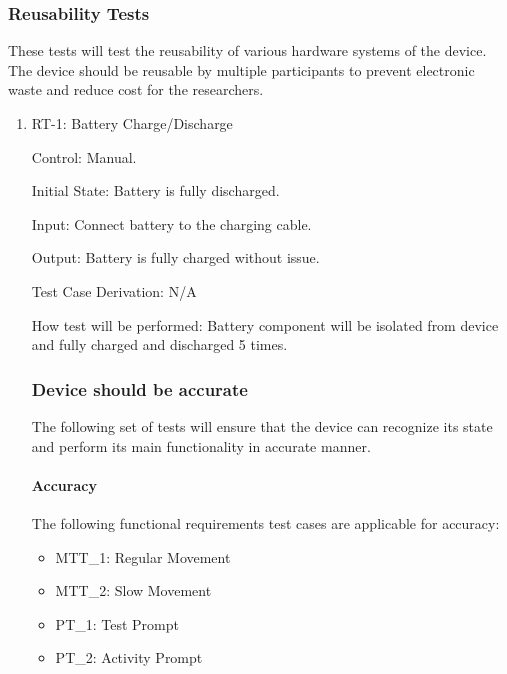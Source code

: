 \documentclass[12pt, titlepage]{article}
\begin{document}
\subsubsection{Reusability Tests}

These tests will test the reusability of various hardware systems of the device. The device should be reusable by multiple participants to prevent electronic waste and reduce cost for the researchers. 

\begin{enumerate}


\item{RT-1: Battery Charge/Discharge\\}

Control: Manual.

Initial State: Battery is fully discharged.

Input: Connect battery to the charging cable.

Output: Battery is fully charged without issue.

Test Case Derivation: N/A

How test will be performed: Battery component will be isolated from device and fully charged and discharged 5 times.

\subsubsection{Device should be accurate}
The following set of tests will ensure that the device can recognize its state and perform its main functionality in accurate manner.

\paragraph{Accuracy\\}

The following functional requirements test cases are applicable for accuracy:

\begin{itemize}
\item MTT\_1: Regular Movement
\item MTT\_2: Slow Movement
\item PT\_1: Test Prompt
\item PT\_2: Activity Prompt
\end{itemize}


\end{enumerate}
\end{document}
